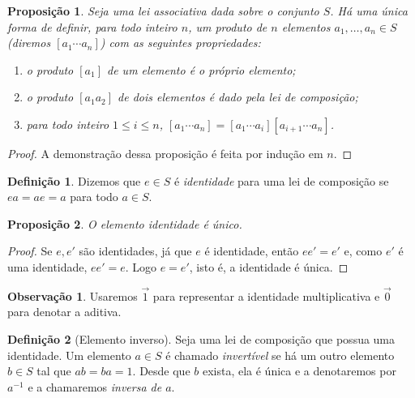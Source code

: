 \documentclass[a4paper,12pt]{report}
\theoremstyle{plain}
\newtheorem{proposicao}{Proposição}[section]
\theoremstyle{definition}
\newtheorem{definicao}{Definição}[section]
\newtheorem{observacao}{Observação}[section]
\begin{document}
\begin{proposicao}
	Seja uma lei associativa dada sobre o conjunto
	\(S\). Há uma única forma de definir, para todo inteiro \(n\), um
	produto de \(n\) elementos \(a_1,\dots,a_n \in S\) (diremos
	\([a_1\dotsb a_n]\)) com as seguintes propriedades:
	
	\begin{enumerate}
		\def\labelenumi{\arabic{enumi}.}
		\item
		o produto \([a_1]\) de um elemento é o próprio elemento;
		\item
		o produto \([a_1a_2]\) de dois elementos é dado pela lei de
		composição;
		\item
		para todo inteiro \(1\leq i\leq n\),
		\([a_1\dotsb a_n] = [a_1\dotsb a_i][a_{i+1}\dotsb a_n]\).
	\end{enumerate}
\end{proposicao}

\begin{proof}
	A demonstração dessa proposição é feita por indução em \(n\).
\end{proof}

\begin{definicao}
	Dizemos que \(e\in S\) é \emph{identidade} para uma lei de composição se \(ea = ae = a\) para todo \(a\in S\).
\end{definicao}

\begin{proposicao}
	O elemento identidade é único.
\end{proposicao}
\begin{proof}
	Se \(e,e'\) são identidades, já que \(e\) é identidade, então \(ee' = e'\) e, como $e'$ é uma identidade, \(ee' = e\). Logo \(e = e'\), isto é, a identidade é única.
\end{proof}

\begin{observacao}
	Usaremos $\vec{1}$ para representar a identidade multiplicativa e $\vec{0}$ para denotar a aditiva.
\end{observacao}

\begin{definicao}[Elemento inverso]
	Seja uma lei de composição que possua uma identidade. Um elemento \(a\in S\) é chamado \emph{invertível} se há um outro elemento \(b\in S\) tal que \(ab = ba = 1\). Desde que \(b\) exista, ela é única e a denotaremos por \(a^{-1}\) e a chamaremos
	\emph{inversa de $a$}.
\end{definicao}
\end{document}
